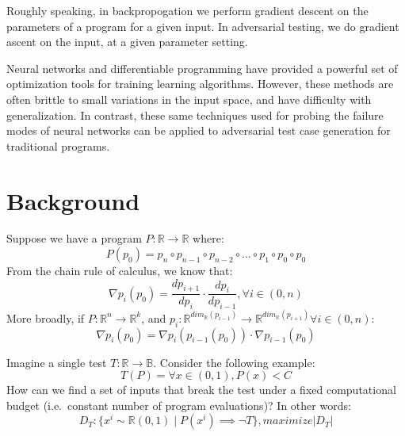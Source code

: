 \documentclass[12pt,initial,twoside,maitrise]{dms}
\numberwithin{equation}{section}
\numberwithin{table}{chapter}
\numberwithin{figure}{chapter}
\begin{document}
Roughly speaking, in backpropogation we perform gradient descent on the parameters of a program for a given input. In adversarial testing, we do gradient ascent on the input, at a given parameter setting.

Neural networks and differentiable programming have provided a powerful set of optimization tools for training learning algorithms. However, these methods are often brittle to small variations in the input space, and have difficulty with generalization. In contrast, these same techniques used for probing the failure modes of neural networks can be applied to adversarial test case generation for traditional programs.

\section{Background}

%
\noindent Suppose we have a program $P: \mathbb{R}\rightarrow\mathbb{R}$ where:
%
\begin{equation}
    P(p_0)=p_n \circ p_{n-1} \circ p_{n-2} \circ ... \circ p_1 \circ p_0 \circ p_0
\end{equation}
%
From the chain rule of calculus, we know that:
%
\begin{equation}
    \nabla p_i(p_0) = \frac{dp_{i+1}}{dp_{i}} \cdot \frac{dp_{i}}{dp_{i-1}}, \forall i \in (0, n)
\end{equation}
%
More broadly, if $P: \mathbb{R}^n\rightarrow\mathbb{R}^k$, and $p_{i}: \mathbb{R}^{dim_{\mathbb{R}}(p_{i-1})}\rightarrow \mathbb{R}^{dim_{\mathbb{R}}(p_{i+1})} \forall i \in (0, n)$:
%
\begin{equation}
    \nabla p_i(p_0) = \nabla p_i(p_{i-1}(p_0)) \cdot \nabla p_{i-1}(p_0)
\end{equation}

%
%
Imagine a single test $T: \mathbb{R} \rightarrow \mathbb{B}$. Consider the following example:
%
\begin{equation}
    T(P) = \forall x \in (0, 1), P(x) < C
\end{equation}
%
How can we find a set of inputs that break the test under a fixed computational budget (i.e.\ constant number of program evaluations)? In other words:
%
\begin{equation}
    D_T: \{ x^i \sim \mathbb{R}(0, 1) \mid P(x^i) \implies \neg T \}, maximize |D_T|
\end{equation}
%
\end{document}
